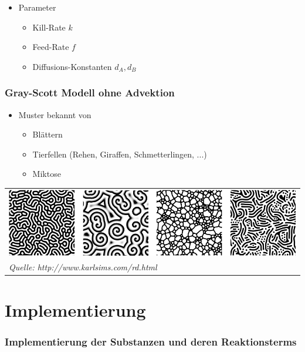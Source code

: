 \documentclass[aspectratio=32]{beamer}
\newcommand{\blob}{\rule[2.2pt]{3pt}{3pt}}
\newcommand{\sectionframe}{\begin{frame}
	\begin{center}
		\textcolor{simtechred}{\Large\insertsection}
	\end{center}
\end{frame}}
\newcommand{\reditem}{\item[\textcolor{simtechred}{$\blob$}]}
\begin{document}
\begin{frame}
\begin{itemize}
  \reditem Parameter
\begin{itemize}
	\item Kill-Rate $k$
	\item Feed-Rate $f$
	\item Diffusions-Konstanten $d_A, d_B$
\end{itemize}
    
\end{itemize}
\end{frame}

\begin{frame}
\frametitle{Gray-Scott Modell ohne Advektion}

\begin{itemize}
	\reditem Muster bekannt von
\begin{itemize}
	\item	Blättern
	\item Tierfellen (Rehen, Giraffen, Schmetterlingen, ...)
	\item Miktose
\end{itemize}
\end{itemize}
\begin{tabular}{l}
	\includegraphics[width=\textwidth,keepaspectratio]{Bilder/gs_scenarios.png} \\
	\textit{Quelle: http://www.karlsims.com/rd.html} \\
\end{tabular}

\end{frame}

\section{Implementierung}
\sectionframe

\begin{frame}
\frametitle{Implementierung der Substanzen und deren Reaktionsterms}

\end{frame}
\end{document}

